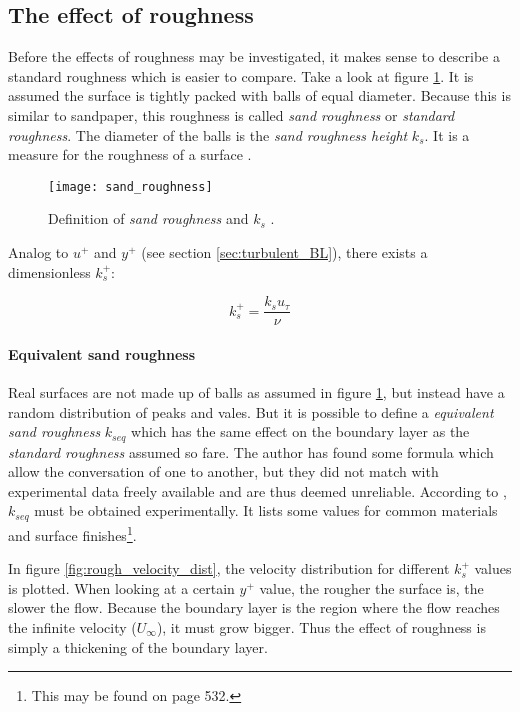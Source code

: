 \subsection{The effect of roughness}
\label{subsec:roughness}
Before the effects of roughness may be investigated, it makes sense to describe
a standard roughness which is easier to compare. Take a look at figure
\ref{fig:sand_roughness}. It is assumed the surface is tightly packed with balls
of equal diameter. Because this is similar to sandpaper, this roughness is
called \textit{sand roughness} or \textit{standard roughness}. The diameter of
the balls is the \textit{sand roughness height} $k_{s}$. It is a measure for the
roughness of a surface \cite{Schlichting2018}.

\begin{figure}[H] \centering
\texttt{[image: sand\_roughness]}
    \caption{Definition of \textit{sand roughness} and $k_{s}$ \cite{Schlichting2018}.}
    \label{fig:sand_roughness}
\end{figure}

\noindent Analog to $u^{+}$ and $y^{+}$ (see section \ref{sec:turbulent_BL}),
there exists a dimensionless $k_{s}^{+}$:

\begin{equation}
  k_{s}^{+} = \frac{k_{s}u_{\tau}}{\nu}
\end{equation}

\paragraph{Equivalent sand roughness}
Real surfaces are not made up of balls as assumed in figure
\ref{fig:sand_roughness}, but instead have a random distribution of peaks and
vales. But it is possible to define a \textit{equivalent sand roughness}
$k_{seq}$ which has the same effect on the boundary layer as the
\textit{standard roughness} assumed so fare. The author has found some formula
which allow the conversation of one to another, but they did not match with
experimental data freely available and are thus deemed unreliable. According to
\cite{Schlichting2018}, $k_{seq}$ must be obtained experimentally. It lists some
values for common materials and surface finishes\footnote{This may be found on
page 532.}.


In figure \ref{fig:rough_velocity_dist}, the velocity distribution for different
$k_{s}^{+}$ values is plotted. When looking at a certain $y^{+}$ value, the
rougher the surface is, the slower the flow. Because the boundary layer is the
region where the flow reaches the infinite velocity ($U_{\infty}$), it must grow
bigger. Thus the effect of roughness is simply a thickening of the boundary
layer.

